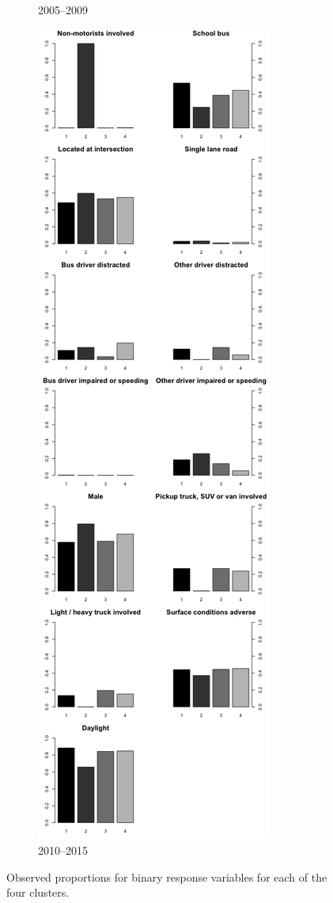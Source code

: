 \begin{figure}[t]
\begin{subfigure}{.5\textwidth}
                \caption{2005--2009}
        \end{subfigure}%
        \begin{subfigure}{.5\textwidth}
 \centering
                  \includegraphics[width=.8\linewidth]{binary_proportions_scaled.png}
                  \caption{2010--2015}
        \end{subfigure}
        \caption{Observed proportions for binary response variables for each of the four clusters.}
 \label{fig:clus2}
\end{figure}

